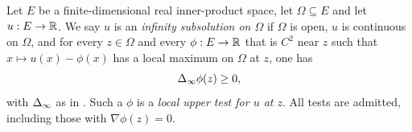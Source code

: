 \begin{definition}
Let $E$ be a finite-dimensional real inner-product space, let $\Omega\subseteq E$
and let $u:E\to\mathbb{R}$. We say $u$ is an \emph{infinity subsolution on $\Omega$} if
$\Omega$ is open, $u$ is continuous on $\Omega$, and for every $z\in\Omega$ and
every $\phi:E\to\mathbb{R}$ that is $C^2$ near $z$ such that $x\mapsto u(x)-\phi(x)$ has
a local maximum on $\Omega$ at $z$, one has
\[
  \Delta_{\infty}\phi(z)\ge0 ,
\]
with $\Delta_{\infty}$ as in . Such a $\phi$ is a \emph{local upper test
for $u$ at $z$}. All tests are admitted, including those with
$\nabla\phi(z)=0$.
\end{definition}
